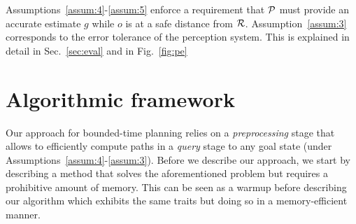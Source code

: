 \documentclass[conference]{IEEEtran}
\begin{document}
Assumptions~\ref{assum:4}-\ref{assum:5} enforce a requirement that $\mathcal{P}$ must provide an accurate estimate $g$ while $o$ is at a safe distance from $\mathcal{R}$.
%
Assumption~\ref{assum:3} corresponds to the error tolerance of the perception system. This is explained in detail in Sec.~\ref{sec:eval} and in Fig.~\ref{fig:pe}




\section{Algorithmic framework}
\label{subsec:strawman}
Our approach for bounded-time planning relies on a \emph{preprocessing} stage that allows to efficiently compute paths in a \emph{query} stage to any goal state (under Assumptions~\ref{assum:4}-\ref{assum:3}). 
%
Before we describe our approach, we start by describing a \naive method that solves the aforementioned problem but requires a prohibitive amount of memory.
%
This can be seen as a warmup before describing our algorithm which exhibits the same traits but doing so in a memory-efficient manner.
\end{document}
